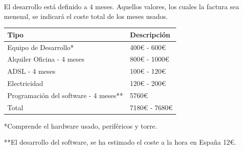 \documentclass[11pt]{article}
\begin{document}
El desarrollo está definido a 4 meses. Aquellos valores, los cuales la factura sea mensual, se indicará el coste total de los meses usados.

\begin{center}
\begin{tabular}{ll}
Tipo & Descripción\\
\hline
Equipo de Desarrollo* & 400€ - 600€\\
Alquiler Oficina - 4 meses & 800€ - 1000€\\
ADSL - 4 meses & 100€ - 120€\\
Electricidad & 120€ - 200€\\
Programación del software - 4 meses** & 5760€\\
\hline
Total & 7180€ - 7680€\\
\end{tabular}
\end{center}

*Comprende el hardware usado, periféricos y torre.

**El desarrollo del software, se ha estimado el coste a la hora en España 12€.


\renewcommand{\refname}{Bibliografía}

\newpage



\end{document}
